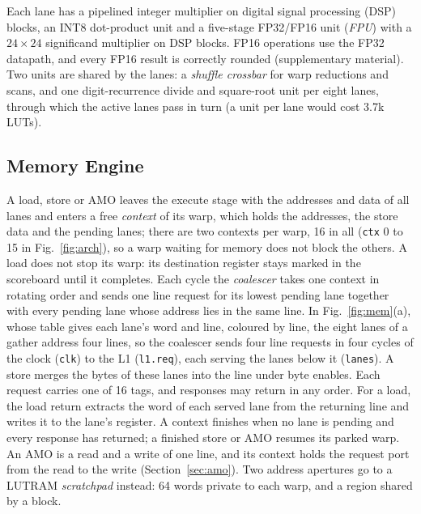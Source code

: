 \documentclass[journal]{IEEEtran}
\begin{document}
Each lane has a pipelined integer multiplier on digital signal processing (DSP)
blocks, an INT8 dot-product unit
and a five-stage FP32/FP16 unit (\emph{FPU}) with a $24\times24$ significand multiplier
on DSP blocks. FP16 operations use the FP32 datapath, and every FP16 result is correctly rounded
(supplementary material). Two units are
shared by the lanes: a \emph{shuffle crossbar} for warp reductions and scans, and one
digit-recurrence divide and square-root unit per eight lanes, through which the active
lanes pass in turn (a unit per lane would cost 3.7k LUTs).

\subsection{Memory Engine}
A load, store or AMO leaves the execute stage with the addresses and data of all lanes
and enters a free \emph{context} of its warp, which holds the addresses, the store
data and the pending lanes; there are two contexts per warp, 16 in all (\texttt{ctx} 0
to 15 in Fig.~\ref{fig:arch}), so a warp
waiting for memory does not block the others. A load does not stop its
warp: its destination register stays marked in the scoreboard until it completes. Each
cycle the \emph{coalescer} takes one context in rotating order and sends one line
request for its lowest pending lane together with every pending lane whose address
lies in the same line. In Fig.~\ref{fig:mem}(a), whose table gives each lane's word and
line, coloured by line, the eight lanes of a gather address four lines, so the
coalescer sends four line requests in four cycles of the clock (\texttt{clk}) to the
L1 (\texttt{l1.req}), each serving the lanes below it (\texttt{lanes}). A store merges the bytes of
these lanes into the line under byte enables. Each request carries one of 16 tags, and responses may return in any
order. For a load, the load return extracts the word of each served lane from the
returning line and writes it to the lane's register. A context finishes when no lane
is pending and every response has returned; a finished store or AMO resumes its parked
warp.
An AMO is a read and a write of one line, and its context holds the request port from
the read to the write (Section~\ref{sec:amo}). Two address apertures go to a LUTRAM
\emph{scratchpad} instead: 64 words private to each warp, and a region shared by a
block.
\end{document}
